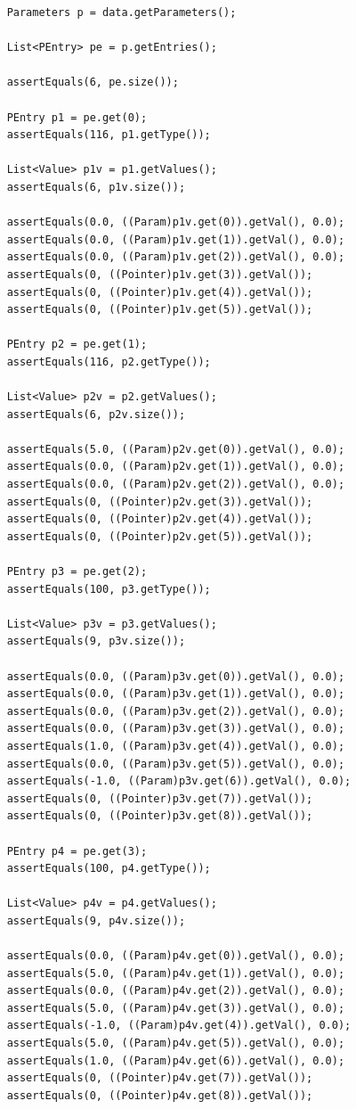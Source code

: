 \begin{Verbatim}
	Parameters p = data.getParameters();
	
	List<PEntry> pe = p.getEntries();
	
	assertEquals(6, pe.size());
	
	PEntry p1 = pe.get(0);
	assertEquals(116, p1.getType());
	
	List<Value> p1v = p1.getValues();
	assertEquals(6, p1v.size());
	
	assertEquals(0.0, ((Param)p1v.get(0)).getVal(), 0.0);
	assertEquals(0.0, ((Param)p1v.get(1)).getVal(), 0.0);
	assertEquals(0.0, ((Param)p1v.get(2)).getVal(), 0.0);
	assertEquals(0, ((Pointer)p1v.get(3)).getVal());
	assertEquals(0, ((Pointer)p1v.get(4)).getVal());
	assertEquals(0, ((Pointer)p1v.get(5)).getVal());
	
	PEntry p2 = pe.get(1);
	assertEquals(116, p2.getType());
	
	List<Value> p2v = p2.getValues();
	assertEquals(6, p2v.size());
	
	assertEquals(5.0, ((Param)p2v.get(0)).getVal(), 0.0);
	assertEquals(0.0, ((Param)p2v.get(1)).getVal(), 0.0);
	assertEquals(0.0, ((Param)p2v.get(2)).getVal(), 0.0);
	assertEquals(0, ((Pointer)p2v.get(3)).getVal());
	assertEquals(0, ((Pointer)p2v.get(4)).getVal());
	assertEquals(0, ((Pointer)p2v.get(5)).getVal());
	
	PEntry p3 = pe.get(2);
	assertEquals(100, p3.getType());
	
	List<Value> p3v = p3.getValues();
	assertEquals(9, p3v.size());
	
	assertEquals(0.0, ((Param)p3v.get(0)).getVal(), 0.0);
	assertEquals(0.0, ((Param)p3v.get(1)).getVal(), 0.0);
	assertEquals(0.0, ((Param)p3v.get(2)).getVal(), 0.0);
	assertEquals(0.0, ((Param)p3v.get(3)).getVal(), 0.0);
	assertEquals(1.0, ((Param)p3v.get(4)).getVal(), 0.0);
	assertEquals(0.0, ((Param)p3v.get(5)).getVal(), 0.0);
	assertEquals(-1.0, ((Param)p3v.get(6)).getVal(), 0.0);
	assertEquals(0, ((Pointer)p3v.get(7)).getVal());
	assertEquals(0, ((Pointer)p3v.get(8)).getVal());
	
	PEntry p4 = pe.get(3);
	assertEquals(100, p4.getType());
	
	List<Value> p4v = p4.getValues();
	assertEquals(9, p4v.size());
	
	assertEquals(0.0, ((Param)p4v.get(0)).getVal(), 0.0);
	assertEquals(5.0, ((Param)p4v.get(1)).getVal(), 0.0);
	assertEquals(0.0, ((Param)p4v.get(2)).getVal(), 0.0);
	assertEquals(5.0, ((Param)p4v.get(3)).getVal(), 0.0);
	assertEquals(-1.0, ((Param)p4v.get(4)).getVal(), 0.0);
	assertEquals(5.0, ((Param)p4v.get(5)).getVal(), 0.0);
	assertEquals(1.0, ((Param)p4v.get(6)).getVal(), 0.0);
	assertEquals(0, ((Pointer)p4v.get(7)).getVal());
	assertEquals(0, ((Pointer)p4v.get(8)).getVal());
	

\end{Verbatim}
